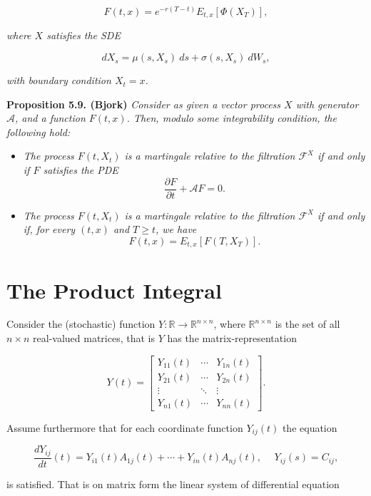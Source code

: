 \documentclass[
]{book}
\providecommand{\tightlist}{%
  \setlength{\itemsep}{0pt}\setlength{\parskip}{0pt}}
\begin{document}
\[
F(t,x)=e^{-r(T-t)}E_{t,x}[\Phi(X_T)],\tag{5.39}
\]

\emph{where \(X\) satisfies the SDE}

\[
dX_s=\mu(s,X_s)\ ds+\sigma(s,X_s)\ dW_s,\tag{5.40}
\]

\emph{with boundary condition \(X_t=x\).}

\textbf{Proposition 5.9. (Bjork)} \emph{Consider as given a vector process \(X\) with generator \(\mathcal{A}\), and a function \(F(t,x)\). Then, modulo some integrability condition, the following hold:}

\begin{itemize}
\tightlist
\item
  \emph{The process \(F(t,X_t)\) is a martingale relative to the filtration \(\mathcal{F}^X\) if and only if \(F\) satisfies the PDE}
  \[
    \frac{\partial F}{\partial t}+\mathcal{A}F=0.
    \]
\item
  \emph{The process \(F(t,X_t)\) is a martingale relative to the filtration \(\mathcal{F}^X\) if and only if, for every \((t,x)\) and \(T\ge t\), we have}
  \[
    F(t,x)=E_{t,x}[F(T,X_T)].
    \]
\end{itemize}

\hypertarget{the-product-integral}{%
\section{The Product Integral}\label{the-product-integral}}

Consider the (stochastic) function \(Y : \mathbb{R} \to \mathbb{R}^{n\times n}\), where \(\mathbb{R}^{n\times n}\) is the set of all \(n\times n\) real-valued matrices, that is \(Y\) has the matrix-representation

\[
Y(t)=\begin{bmatrix}
Y_{11}(t) & \cdots & Y_{1n}(t)\\
Y_{21}(t) & \cdots & Y_{2n}(t)\\
\vdots & \ddots & \vdots \\
Y_{n1}(t) & \cdots & Y_{nn}(t)
\end{bmatrix}.
\]

Assume furthermore that for each coordinate function \(Y_{ij}(t)\) the equation

\[
\frac{dY_{ij}}{dt}(t)=Y_{i1}(t)A_{1j}(t)+\cdots+Y_{in}(t)A_{nj}(t),\hspace{15pt}Y_{ij}(s)=C_{ij},
\]

is satisfied. That is on matrix form the linear system of differential equation
\end{document}
